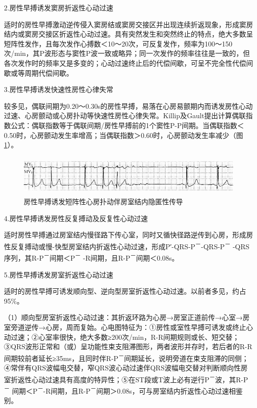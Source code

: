 2.房性早搏诱发窦房折返性心动过速

适时的房性早搏激动逆传侵入窦房结或窦房交接区并出现连续折返现象，形成窦房结内或窦房交接区折返性心动过速。具有突然发生和突然终止的特点，绝大多数呈短阵性发作，且每次发作心搏数＜10～20次，可反复发作，频率为100～150次/min，其P波形态与窦性P波一致或略异；同一次发作的频率往往是一致的，但各次发作时的频率又是多变的；心动过速终止后的代偿间歇，可呈不完全性代偿间歇或等周期代偿间歇。

3.房性早搏诱发快速性房性心律失常

较多见，偶联间期为0.20～0.30s的房性早搏，易落在心房易颤期内而诱发房性心动过速、心房颤动或心房扑动等快速性房性心律失常。Killip及Gault提出计算偶联指数公式：偶联指数等于偶联间期/房性早搏前的1个窦性P-P间期。当偶联指数＜0.50时，心房颤动发生率增高；当偶联指数＞0.60时，心房颤动发生率减少（图\ref{fig11-13}）。

\begin{figure}[!htbp]
 \centering
 \includegraphics[width=5.58333in,height=0.80208in]{./images/Image00173.jpg}
 \captionsetup{justification=centering}
 \caption{房性早搏诱发短阵性心房扑动伴房室结内隐匿性传导}
 \label{fig11-13}
  \end{figure} 

4.房性早搏诱发房性反复搏动及反复性心动过速

适时房性早搏通过房室结内慢径路下传心室，同时又循快径路逆传到心房，形成房性反复搏动或慢-快型房室结内折返性心动过速，形成P′-QRS-P\textsuperscript{－}-QRS-P\textsuperscript{－} -QRS序列，其R-P\textsuperscript{－}间期＜P\textsuperscript{－} -R间期，且R-P\textsuperscript{－}间期＜0.08s。

5.房性早搏诱发房室折返性心动过速

适时的房性早搏可诱发顺向型、逆向型房室折返性心动过速。以前者多见，约占95\%。

（1）顺向型房室折返性心动过速：其折返环路为心房→房室正道前传→心室→房室旁道逆传→心房，周而复始。心电图特征为：①房性或室性早搏可诱发或终止心动过速；②心室率很快，绝大多数≥200次/min，R-R间期规则或长、短交替；③QRS波形正常和（或）呈功能性束支阻滞图形，两者波形并存时，若后者的R-R间期较前者延长≥35ms，且同时伴R-P\textsuperscript{－}间期延长，说明旁道在束支阻滞的同侧；④常伴有QRS波幅电交替，窄QRS波心动过速伴QRS波幅电交替对判断顺向性房室折返性心动过速具有高度的特异性；⑤在ST段或T波上必有逆行P\textsuperscript{－}波，其R-P\textsuperscript{－} 间期＜P\textsuperscript{－}-R间期，且R-P\textsuperscript{－}间期＞0.08s，可与房室结内折返性心动过速相鉴别。

